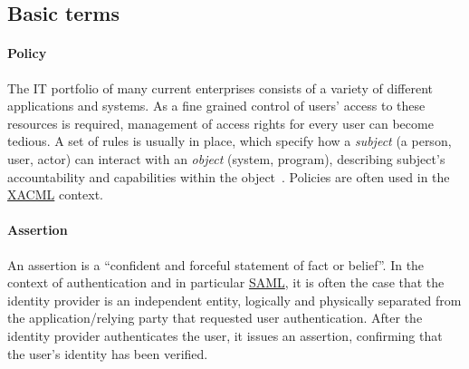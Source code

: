 \subsection{Basic terms}

\paragraph{Policy}
The IT portfolio of many current enterprises consists of a variety of different applications and systems. As a fine grained control of users' access to these resources is required, management of access rights for every user can become tedious. A set of rules is usually in place, which specify how a \textit{subject} (a person, user, actor) can interact with an \textit{object} (system, program), describing subject's accountability and capabilities within the object~\cite{Feltus2008PreliminaryConcept}. Policies are often used in the \hyperref[sec:xacml]{XACML} context.

\paragraph{Assertion}
An assertion is a ``confident and forceful statement of fact or belief''\footnotemark. In the context of authentication and in particular \hyperref[sec:saml]{SAML}, it is often the case that the identity provider is an independent entity, logically and physically separated from the application/relying party that requested user authentication. After the identity provider authenticates the user, it issues an assertion, confirming that the user's identity has been verified.


